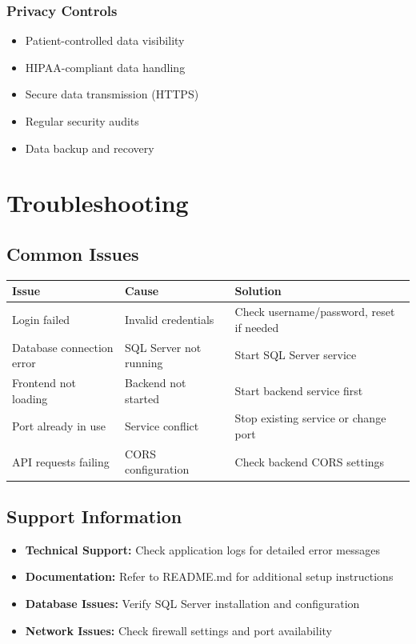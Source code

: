 \documentclass[12pt,a4paper]{article}
\begin{document}
\subsubsection{Privacy Controls}

\begin{itemize}
    \item Patient-controlled data visibility
    \item HIPAA-compliant data handling
    \item Secure data transmission (HTTPS)
    \item Regular security audits
    \item Data backup and recovery
\end{itemize}

\section{Troubleshooting}

\subsection{Common Issues}

\begin{longtable}{@{}|p{4cm}|p{5cm}|p{5cm}|@{}}
\hline
\textbf{Issue} & \textbf{Cause} & \textbf{Solution} \\
\hline
Login failed & Invalid credentials & Check username/password, reset if needed \\
\hline
Database connection error & SQL Server not running & Start SQL Server service \\
\hline
Frontend not loading & Backend not started & Start backend service first \\
\hline
Port already in use & Service conflict & Stop existing service or change port \\
\hline
API requests failing & CORS configuration & Check backend CORS settings \\
\hline
\end{longtable}

\subsection{Support Information}

\begin{itemize}
    \item \textbf{Technical Support:} Check application logs for detailed error messages
    \item \textbf{Documentation:} Refer to README.md for additional setup instructions
    \item \textbf{Database Issues:} Verify SQL Server installation and configuration
    \item \textbf{Network Issues:} Check firewall settings and port availability
\end{itemize}
\end{document}
